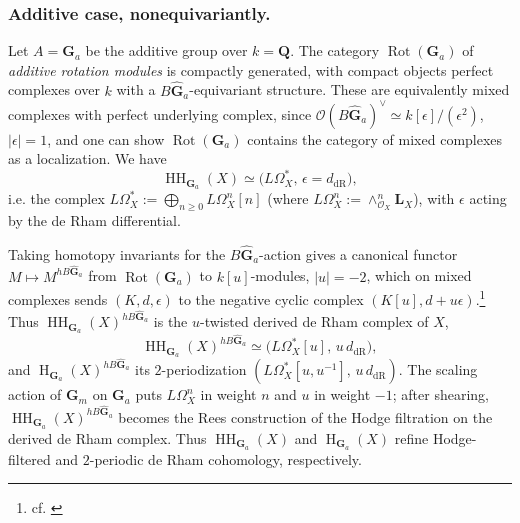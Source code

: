 \documentclass[12pt, oneside]{amsart}
\numberwithin{equation}{section}
\theoremstyle{remark}
\theoremstyle{plain}
\renewcommand{\ge}{\geqslant}
\newcommand{\OO}{\mathcal{O}}
\newcommand{\GGhat}{\widehat{\mathbf{G}}}
\newcommand{\GGa}{\mathbf{G}_{a}}
\newcommand{\GGm}{\mathbf{G}_{m}}
\newcommand{\bQ}{\mathbf{Q}}
\newcommand{\HH}{\operatorname{HH}}
\newcommand{\Hcoh}{\operatorname{H}}
\newcommand{\LL}{\mathbf{L}}
\newcommand{\Rot}{\operatorname{Rot}}
\begin{document}
\subsubsection{Additive case, nonequivariantly.}\label{sssec:intro/coh/add}
Let $A = \GGa$ be the additive group over $k=\bQ$.
The category $\Rot(\GGa)$ of \emph{additive rotation modules} is compactly generated, with compact objects perfect complexes over $k$ with a $B\GGhat_a$-equivariant structure.
These are equivalently mixed complexes \cite{Kassel} with perfect underlying complex, since $\OO(B\GGhat_a)^\vee \simeq k[\epsilon]/(\epsilon^2)$, $|\epsilon| = 1$, and one can show $\Rot(\GGa)$ contains the category of mixed complexes as a localization.
We have
\[
  \HH_{\GGa}(X) \simeq \bigl(L\Omega^*_{X},\, \epsilon = d_{\mathrm{dR}}\bigr),
\]
i.e. the complex $L\Omega^*_X := \bigoplus_{n \ge 0} L\Omega^n_X[n]$ (where $L\Omega^n_X := \wedge^n_{\OO_X}\LL_X$), with $\epsilon$ acting by the de Rham differential.

Taking homotopy invariants for the $B\GGhat_a$-action gives a canonical functor $M \mapsto M^{hB\GGhat_a}$ from $\Rot(\GGa)$ to $k[u]$-modules, $|u| = -2$, which on mixed complexes sends $(K, d, \epsilon)$ to the negative cyclic complex $(K[u], d + u\epsilon)$.\footnote{%
  cf. \cite[Lem.~2.2]{HoyoisCirc}
}
Thus $\HH_{\GGa}(X)^{hB\GGhat_a}$ is the $u$-twisted derived de Rham complex of $X$,
\[
  \HH_{\GGa}(X)^{hB\GGhat_a} \simeq \bigl(L\Omega^*_{X}[u],\, u\, d_{\mathrm{dR}}\bigr),
\]
and $\Hcoh_{\GGa}(X)^{hB\GGhat_a}$ its $2$-periodization $(L\Omega^*_{X}[u, u^{-1}],\, u\, d_{\mathrm{dR}})$.
The scaling action of $\GGm$ on $\GGa$ puts $L\Omega^n_{X}$ in weight $n$ and $u$ in weight $-1$; after shearing, $\HH_{\GGa}(X)^{hB\GGhat_a}$ becomes the Rees construction of the Hodge filtration on the derived de Rham complex.
Thus $\HH_{\GGa}(X)$ and $\Hcoh_{\GGa}(X)$ refine Hodge-filtered and $2$-periodic de Rham cohomology, respectively.
\end{document}
